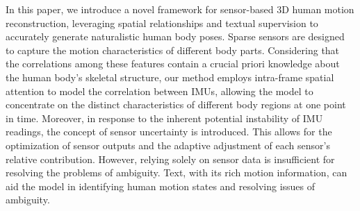 \documentclass[letterpaper]{article} %
\begin{document}
In this paper, we introduce a novel framework for sensor-based 3D human motion reconstruction, leveraging spatial relationships and textual supervision to accurately generate naturalistic human body poses.
Sparse sensors are designed to capture the motion characteristics of different body parts. Considering that the correlations among these features contain a crucial priori knowledge about the human body's skeletal structure, our method employs intra-frame spatial attention to model the correlation between IMUs, allowing the model to concentrate on the distinct characteristics of different body regions at one point in time. Moreover, in response to the inherent potential instability of IMU readings, the concept of sensor uncertainty is introduced. This allows for the optimization of sensor outputs and the adaptive adjustment of each sensor's relative contribution. However, relying solely on sensor data is insufficient for resolving the problems of ambiguity. Text, with its rich motion information, can aid the model in identifying human motion states and resolving issues of ambiguity.
\end{document}
